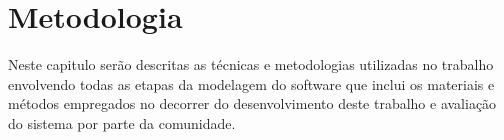 \chapter{Metodologia}

Neste capitulo serão descritas as técnicas e metodologias utilizadas no
trabalho envolvendo todas as etapas da modelagem do software que inclui os
materiais e métodos empregados no decorrer do desenvolvimento deste trabalho e
avaliação do sistema por parte da comunidade. 

